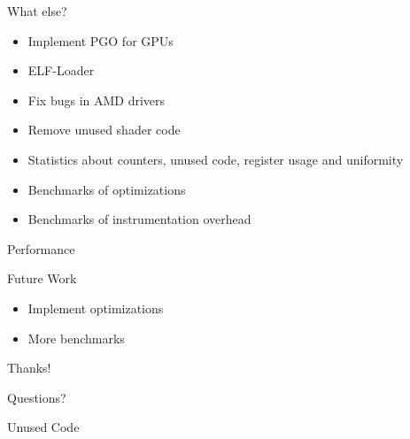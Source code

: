 \documentclass[xcolor={usenames,dvipsnames}, aspectratio=169, 12pt]{beamer}
\begin{document}
\begin{frame}{What else?}
\begin{itemize}
	\item Implement PGO for GPUs
	\item ELF-Loader
	\item Fix bugs in AMD drivers
	\item Remove unused shader code
	\item Statistics about counters, unused code, register usage and uniformity
	\item Benchmarks of optimizations
	\item Benchmarks of instrumentation overhead
\end{itemize}
\end{frame}

{\framelogo{\centering}
\begin{frame}{Performance}

\end{frame}}

\begin{frame}{Future Work}
\begin{itemize}
	\item Implement optimizations
	\item More benchmarks
\end{itemize}
\end{frame}

\begin{tumplainframe}{Thanks!}
\begin{center}
	\Huge Questions?
\end{center}
\end{tumplainframe}

\begin{frame}{Unused Code}
	
\end{frame}
\end{document}
